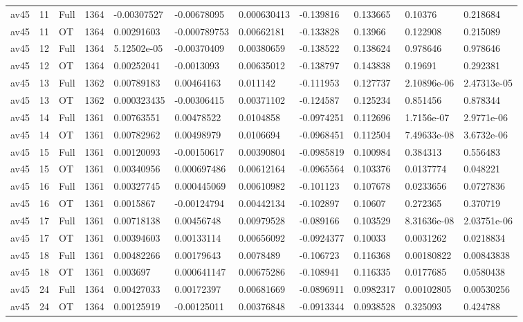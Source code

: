 \begin{landscape}
\begin{longtable}{lllllllllll}
av45 & 11 & Full & 1364 & -0.00307527 & -0.00678095 & 0.000630413 & -0.139816 & 0.133665 & 0.10376 & 0.218684 \\
av45 & 11 & OT & 1364 & 0.00291603 & -0.000789753 & 0.00662181 & -0.133828 & 0.13966 & 0.122908 & 0.215089 \\
av45 & 12 & Full & 1364 & 5.12502e-05 & -0.00370409 & 0.00380659 & -0.138522 & 0.138624 & 0.978646 & 0.978646 \\
av45 & 12 & OT & 1364 & 0.00252041 & -0.0013093 & 0.00635012 & -0.138797 & 0.143838 & 0.19691 & 0.292381 \\
av45 & 13 & Full & 1362 & 0.00789183 & 0.00464163 & 0.011142 & -0.111953 & 0.127737 & 2.10896e-06 & 2.47313e-05 \\
av45 & 13 & OT & 1362 & 0.000323435 & -0.00306415 & 0.00371102 & -0.124587 & 0.125234 & 0.851456 & 0.878344 \\
av45 & 14 & Full & 1361 & 0.00763551 & 0.00478522 & 0.0104858 & -0.0974251 & 0.112696 & 1.7156e-07 & 2.9771e-06 \\
av45 & 14 & OT & 1361 & 0.00782962 & 0.00498979 & 0.0106694 & -0.0968451 & 0.112504 & 7.49633e-08 & 3.6732e-06 \\
av45 & 15 & Full & 1361 & 0.00120093 & -0.00150617 & 0.00390804 & -0.0985819 & 0.100984 & 0.384313 & 0.556483 \\
av45 & 15 & OT & 1361 & 0.00340956 & 0.000697486 & 0.00612164 & -0.0965564 & 0.103376 & 0.0137774 & 0.048221 \\
av45 & 16 & Full & 1361 & 0.00327745 & 0.000445069 & 0.00610982 & -0.101123 & 0.107678 & 0.0233656 & 0.0727836 \\
av45 & 16 & OT & 1361 & 0.0015867 & -0.00124794 & 0.00442134 & -0.102897 & 0.10607 & 0.272365 & 0.370719 \\
av45 & 17 & Full & 1361 & 0.00718138 & 0.00456748 & 0.00979528 & -0.089166 & 0.103529 & 8.31636e-08 & 2.03751e-06 \\
av45 & 17 & OT & 1361 & 0.00394603 & 0.00133114 & 0.00656092 & -0.0924377 & 0.10033 & 0.0031262 & 0.0218834 \\
av45 & 18 & Full & 1361 & 0.00482266 & 0.00179643 & 0.0078489 & -0.106723 & 0.116368 & 0.00180822 & 0.00843838 \\
av45 & 18 & OT & 1361 & 0.003697 & 0.000641147 & 0.00675286 & -0.108941 & 0.116335 & 0.0177685 & 0.0580438 \\
av45 & 24 & Full & 1364 & 0.00427033 & 0.00172397 & 0.00681669 & -0.0896911 & 0.0982317 & 0.00102805 & 0.00530256 \\
av45 & 24 & OT & 1364 & 0.00125919 & -0.00125011 & 0.00376848 & -0.0913344 & 0.0938528 & 0.325093 & 0.424788 \\

\end{longtable}
\end{landscape}
